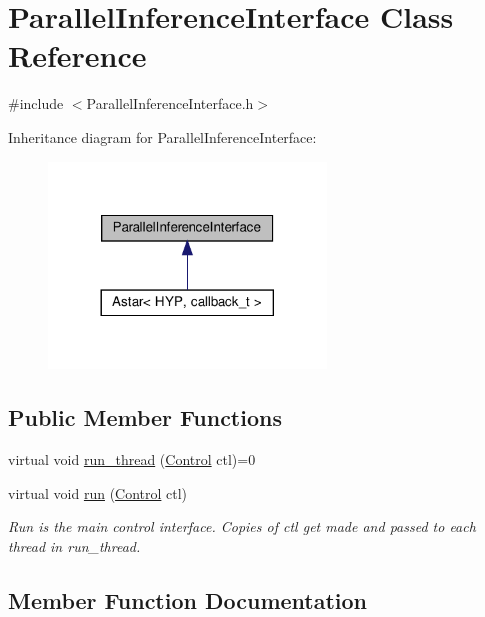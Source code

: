 \hypertarget{class_parallel_inference_interface}{}\section{Parallel\+Inference\+Interface Class Reference}
\label{class_parallel_inference_interface}


{\ttfamily \#include $<$Parallel\+Inference\+Interface.\+h$>$}



Inheritance diagram for Parallel\+Inference\+Interface\+:
\nopagebreak
\begin{figure}[H]
\begin{center}
\leavevmode
\includegraphics[width=209pt]{class_parallel_inference_interface__inherit__graph}
\end{center}
\end{figure}
\subsection*{Public Member Functions}
\begin{DoxyCompactItemize}
\item 
virtual void \hyperlink{class_parallel_inference_interface_ae3f9f1a2128878183869d0cc6c7434f6}{run\+\_\+thread} (\hyperlink{struct_control}{Control} ctl)=0
\item 
virtual void \hyperlink{class_parallel_inference_interface_ad33281e8f8fdbfe21afb786ad172b621}{run} (\hyperlink{struct_control}{Control} ctl)
\begin{DoxyCompactList}\small\item\em Run is the main control interface. Copies of ctl get made and passed to each thread in run\+\_\+thread. \end{DoxyCompactList}\end{DoxyCompactItemize}


\subsection{Member Function Documentation}
\mbox{\label{class_parallel_inference_interface_ad33281e8f8fdbfe21afb786ad172b621}} 
